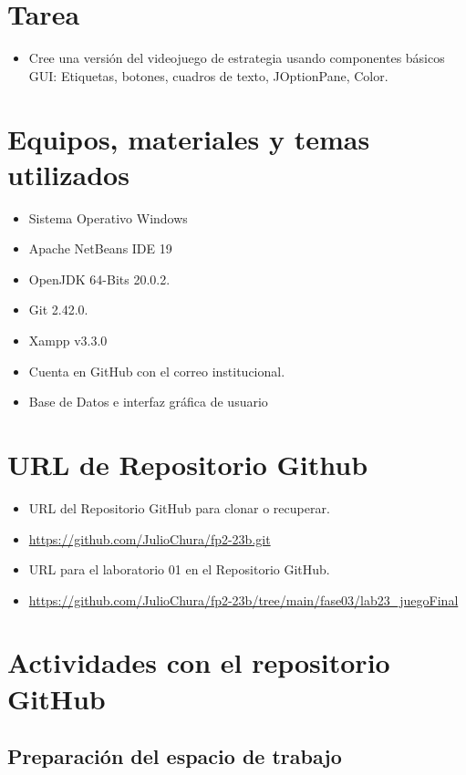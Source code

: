 \documentclass{article}
\begin{document}
	\section{Tarea}
	\begin{itemize}		
		\item Cree una versión del videojuego de estrategia usando componentes básicos GUI: Etiquetas, botones,
		cuadros de texto, JOptionPane, Color.
	\end{itemize}
	
	\section{Equipos, materiales y temas utilizados}
	\begin{itemize}
		\item Sistema Operativo Windows
		\item Apache NetBeans IDE 19
		\item OpenJDK 64-Bits 20.0.2.
		\item Git 2.42.0.
		\item Xampp v3.3.0
		\item Cuenta en GitHub con el correo institucional.
		\item Base de Datos e interfaz gráfica de usuario
	\end{itemize}
	
	\section{URL de Repositorio Github}
	\begin{itemize}
		\item URL del Repositorio GitHub para clonar o recuperar.
		\item \url{https://github.com/JulioChura/fp2-23b.git}
		\item URL para el laboratorio 01 en el Repositorio GitHub.
		\item \url{https://github.com/JulioChura/fp2-23b/tree/main/fase03/lab23_juegoFinal}
	\end{itemize}
	
	\section{Actividades con el repositorio GitHub}
	
	
	
	
	
	
	
	\subsection{Preparación del espacio de trabajo}
	
\end{document}
